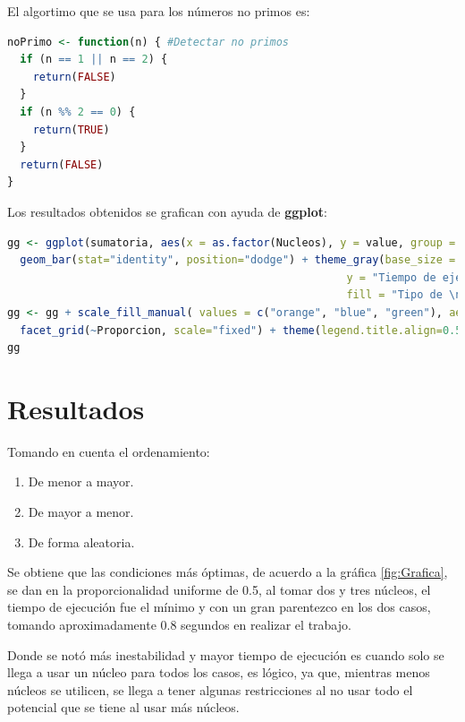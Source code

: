 \documentclass{article}
\begin{document}
\newpage

El algortimo que se usa para los n\'umeros no primos es:

\begin{lstlisting}[language=R]
noPrimo <- function(n) { #Detectar no primos
  if (n == 1 || n == 2) {
    return(FALSE)
  }
  if (n %% 2 == 0) {
    return(TRUE)
  }
  return(FALSE)
}
\end{lstlisting}

Los resultados obtenidos se grafican con ayuda de \textbf{ggplot}:

\begin{lstlisting}[language=R]
gg <- ggplot(sumatoria, aes(x = as.factor(Nucleos), y = value, group = interaction (Nucleos, Orden), fill = as.factor(Orden))) +
  geom_bar(stat="identity", position="dodge") + theme_gray(base_size = 14) + labs(x = "Cantidad de n\u{FA}cleos", 
                                                     y = "Tiempo de ejecuci\u{F3}n en segundos", 
                                                     fill = "Tipo de \n ordenamiento") 
gg <- gg + scale_fill_manual( values = c("orange", "blue", "green"), aesthetics = "fill") + 
  facet_grid(~Proporcion, scale="fixed") + theme(legend.title.align=0.5) 
gg
\end{lstlisting}

\section{Resultados}

Tomando en cuenta el ordenamiento:

\begin{enumerate}

\item{De menor a mayor.}

\item{De mayor a menor.}

\item{De forma aleatoria.}

\end{enumerate}

Se obtiene que las condiciones  m\'as \'optimas, de acuerdo a la gr\'afica \ref{fig:Grafica}, se dan en la proporcionalidad uniforme de 0.5, al tomar dos y tres n\'ucleos, el tiempo de ejecuci\'on fue el m\'inimo y con un gran parentezco en los dos casos, tomando aproximadamente 0.8 segundos en realizar el trabajo.

Donde se not\'o m\'as inestabilidad y mayor tiempo de ejecuci\'on es cuando solo se llega a usar un n\'ucleo para todos los casos, es l\'ogico, ya que, mientras menos n\'ucleos se utilicen, se llega a tener algunas restricciones al no usar todo el potencial que se tiene al usar m\'as n\'ucleos.
\end{document}
